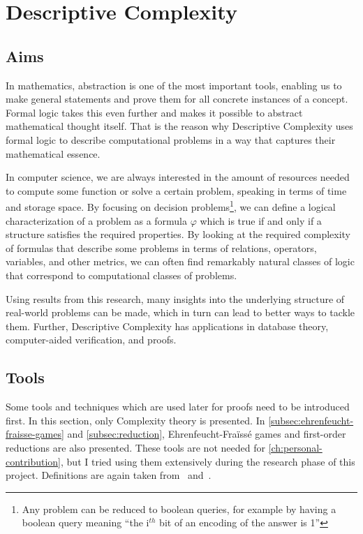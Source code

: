 

\chapter{Descriptive Complexity}\label{ch:descriptive-complexity}


\section{Aims}\label{sec:aims}

In mathematics, abstraction is one of the most important tools, enabling us to make general statements and prove them for all concrete instances of a concept.
Formal logic takes this even further and makes it possible to abstract mathematical thought itself.
That is the reason why {Descriptive} Complexity uses formal logic to describe computational problems in a way that captures their mathematical essence.

In computer science, we are always interested in the amount of resources needed to compute some function or solve a certain problem, speaking in terms of time and storage space.
By focusing on decision problems\footnote{Any problem can be reduced to boolean queries, for example by having a boolean query meaning ``the i$^{th}$ bit of an encoding of the answer is 1''}, we can define a logical characterization of a problem as a formula $\varphi$ which is true if and only if a structure satisfies the required properties.
By looking at the required complexity of formulas that describe some problems in terms of relations, operators, variables, and other metrics, we can often find remarkably natural classes of logic that correspond to computational classes of problems.

Using results from this research, many insights into the underlying structure of real-world problems can be made, which in turn can lead to better ways to tackle them.
Further, Descriptive Complexity has applications in database theory, computer-aided verification, and proofs.


\section{Tools}\label{sec:tools}

Some tools and techniques which are used later for proofs need to be introduced first.
In this section, only Complexity theory is presented.
In \cref{subsec:ehrenfeucht-fraisse-games} and \cref{subsec:reduction},   Ehrenfeucht-Fraïssé games and first-order reductions are also presented.
These tools are not needed for \cref{ch:personal-contribution}, but I tried using them extensively during the research phase of this project.
Definitions are again taken from~\cite{theory-cs} and~\cite{descriptive-complexity}.

